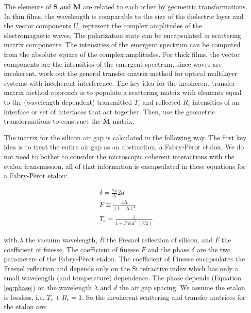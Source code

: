 \documentclass[osajnl,preprint,showpacs,superscriptaddress,12pt]{revtex4-1} %
\begin{document}
The elements of $\boldsymbol{S}$ and $\boldsymbol{M}$ are related to each other by geometric transformations\cite{2007fuph.book.....S}.  In thin films, the wavelength is comparable to the size of the dielectric layer and the vector components $U_{i}$ represent the complex amplitudes of the electromagnetic waves.  The polarization state can be encapsulated in scattering matrix components\cite{2007fuph.book.....S}.  The intensities of the emergent spectrum can be computed from the absolute square of the complex amplitudes.  For thick films, the vector components are the intensities of the emergent spectrum, since waves are incoherent.  \cite{2002ApOpt..41.3978K} work out the general transfer-matrix method for optical multilayer systems with incoherent interference.  The key idea for the incoherent transfer matrix method approach is to populate a scattering matrix with elements equal to the (wavelength dependent) transmitted $T_i$ and reflected $R_i$ intensities of an interface or set of interfaces that act together.  Then, use the geometric transformations to construct the $\boldsymbol{M}$ matrix.  

The matrix for the silicon air gap is calculated in the following way.  The first key idea is to treat the entire air gap as an abstraction, a Fabry-P\`erot etalon.  We do not need to bother to consider the microscopic coherent interactions with the etalon transmission, all of that information is encapsulated in these equations for a Fabry-P\`erot etalon:

\begin{eqnarray}
 \delta = \frac{2\pi}{\lambda}2d \label{eq:phase} \\
  F \equiv \frac{4R}{(1-R)^2} \\
 T_e = \frac{1}{1+F\sin^2(\delta/2)}  \label{eq:FabPerot}
\end{eqnarray}

with $\lambda$ the vacuum wavelength, $R$ the Fresnel reflection of silicon, and $F$ the coefficient of finesse.  The coefficient of finesse $F$ and the phase $\delta$ are the two parameters of the Fabry-P\`erot etalon.  The coefficient of Finesse encapsulates the Fresnel reflection and depends only on the Si refractive index which has only a small wavelength (and temperature) dependence.  The phase depends (Equation \ref{eq:phase}) on the wavelength $\lambda$ and $d$ the air gap spacing.  We assume the etalon is lossless, i.e. $T_e+R_e=1$.  So the incoherent scattering and transfer matrices for the etalon are:
\end{document}
